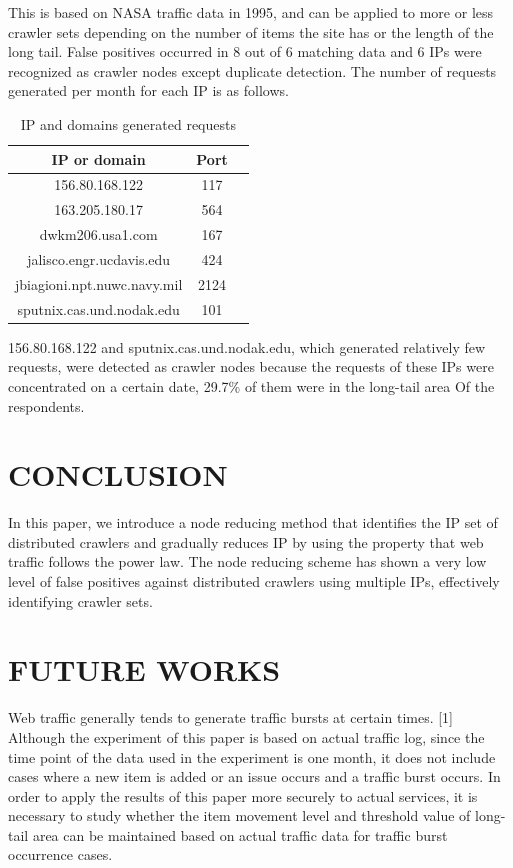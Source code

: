 \documentclass[sigconf,anonymous=false]{acmart}
\begin{document}
\begin{enumerate}
This is based on NASA traffic data in 1995, and can be applied to more or less crawler sets depending on the number of items the site has or the length of the long tail.
False positives occurred in 8 out of 6 matching data and 6 IPs were recognized as crawler nodes except duplicate detection. The number of requests generated per month for each IP is as follows.


\begin{table}
  \caption{IP and domains generated requests}
  \label{tab:freq}
  \begin{tabular}{ccl}
    \toprule
    IP or domain&Port\\
    \midrule
    156.80.168.122 & 117\\
    163.205.180.17 & 564\\
    dwkm206.usa1.com & 167\\
    jalisco.engr.ucdavis.edu & 424\\
    jbiagioni.npt.nuwc.navy.mil & 2124\\
    sputnix.cas.und.nodak.edu & 101\\
  \bottomrule
\end{tabular}
\end{table}


156.80.168.122 and sputnix.cas.und.nodak.edu, which generated relatively few requests, were detected as crawler nodes because the requests of these IPs were concentrated on a certain date, 29.7\% of them were in the long-tail area Of the respondents.

\end{enumerate}



%
%
\section{CONCLUSION}
In this paper, we introduce a node reducing method that identifies the IP set of distributed crawlers and gradually reduces IP by using the property that web traffic follows the power law.
The node reducing scheme has shown a very low level of false positives against distributed crawlers using multiple IPs, effectively identifying crawler sets.



%
%
\section{FUTURE WORKS}
Web traffic generally tends to generate traffic bursts at certain times. [1] Although the experiment of this paper is based on actual traffic log, since the time point of the data used in the experiment is one month, it does not include cases where a new item is added or an issue occurs and a traffic burst occurs.
In order to apply the results of this paper more securely to actual services, it is necessary to study whether the item movement level and threshold value of long-tail area can be maintained based on actual traffic data for traffic burst occurrence cases.
\end{document}
